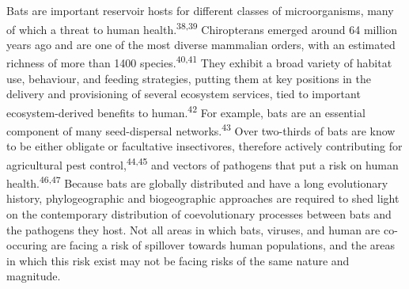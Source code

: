 \documentclass[11pt]{article}
\begin{document}
Bats are important reservoir hosts for different classes of
microorganisms, many of which a threat to human
health.\textsuperscript{38,39} Chiropterans emerged around 64 million
years ago and are one of the most diverse mammalian orders, with an
estimated richness of more than 1400 species.\textsuperscript{40,41}
They exhibit a broad variety of habitat use, behaviour, and feeding
strategies, putting them at key positions in the delivery and
provisioning of several ecosystem services, tied to important
ecosystem-derived benefits to human.\textsuperscript{42} For example,
bats are an essential component of many seed-dispersal
networks.\textsuperscript{43} Over two-thirds of bats are know to be
either obligate or facultative insectivores, therefore actively
contributing for agricultural pest control,\textsuperscript{44,45} and
vectors of pathogens that put a risk on human
health.\textsuperscript{46,47} Because bats are globally distributed and
have a long evolutionary history, phylogeographic and biogeographic
approaches are required to shed light on the contemporary distribution
of coevolutionary processes between bats and the pathogens they host.
Not all areas in which bats, viruses, and human are co-occuring are
facing a risk of spillover towards human populations, and the areas in
which this risk exist may not be facing risks of the same nature and
magnitude.
\end{document}
